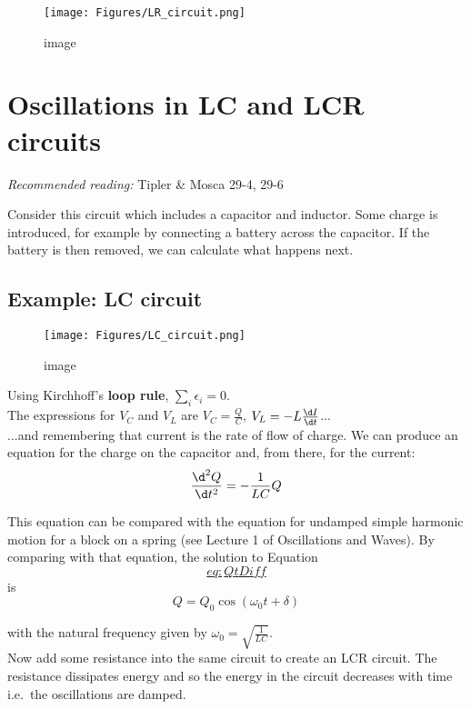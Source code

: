 \documentclass[
]{book}
\theoremstyle{definition}
\theoremstyle{definition}
\theoremstyle{definition}
\theoremstyle{definition}
\theoremstyle{remark}
\begin{document}
\begin{figure}
\centering
\texttt{[image: Figures/LR\_circuit.png]}
\caption{image}
\end{figure}

\hypertarget{oscillations-in-lc-and-lcr-circuits}{%
\section{Oscillations in LC and LCR circuits}\label{oscillations-in-lc-and-lcr-circuits}}

\emph{Recommended reading:} Tipler \& Mosca 29-4, 29-6

Consider this circuit which includes a capacitor and inductor. Some
charge is introduced, for example by connecting a battery across the
capacitor. If the battery is then removed, we can calculate what happens
next.

\hypertarget{example-lc-circuit}{%
\subsection*{Example: LC circuit}\label{example-lc-circuit}}

\begin{figure}
\centering
\texttt{[image: Figures/LC\_circuit.png]}
\caption{image}
\end{figure}

Using Kirchhoff's \textbf{loop rule}, \(\sum_i \epsilon_i = 0\).\\
The expressions for \(V_C\) and \(V_L\) are \(V_C = \frac{Q}{C}\),
\(V_L = -L \frac{\d I}{\d t}\)...\\
...and remembering that current is the rate of flow of charge. We can
produce an equation for the charge on the capacitor and, from there, for
the current: \[\frac{\d^2 Q}{\d t^2} = - \frac{1}{LC} Q
\label{eq:QtDiff}\]

This equation can be compared with the equation for undamped simple
harmonic motion for a block on a spring (see Lecture 1 of Oscillations
and Waves). By comparing with that equation, the solution to Equation
\protect\hyperlink{eq:QtDiff}{\[eq:QtDiff\]} is \[Q = Q_0 \cos⁡(\omega_0 t + \delta)\]

with the natural frequency given by \(\omega_0 = \sqrt{ \frac{1}{LC} }\).\\
Now add some resistance into the same circuit to create an LCR circuit.
The resistance dissipates energy and so the energy in the circuit
decreases with time i.e.~the oscillations are damped.
\end{document}
